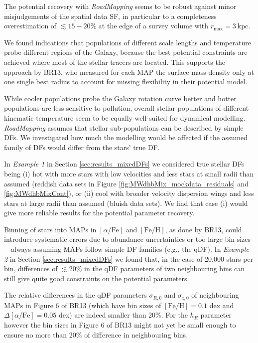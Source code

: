 \documentclass[iop,revtex4,numberedappendix,appendixfloats]{emulateapj}
\newcommand{\MAP}{MAP}
\newcommand{\MAPs}{MAPs}
\newcommand{\RM}{{\sl RoadMapping}}
\begin{document}
The potential recovery with \RM{} seems to be robust against minor misjudgements of the spatial data SF, in particular to a completeness overestimation of $\lesssim 15-20\%$ at the edge of a survey volume with $r_\text{max}=3~\text{kpc}$.

We found indications that populations of different scale lengths and temperature probe different regions of the Galaxy, because the best potential constraints are achieved where most of the stellar tracers are located. This supports the approach by BR13, who measured for each \MAP{} the surface mass density only at one single best radius to account for missing flexibility in their potential model. 

While cooler populations probe the Galaxy rotation curve better and hotter populations are less sensitive to pollution, overall stellar populations of different kinematic temperature seem to be equally well-suited for dynamical modelling.\\

 \RM{} assumes that stellar sub-populations can be described by simple DFs. We investigated how much the modelling would be affected if the assumed family of DFs would differ from the stars' true DF.

In \emph{Example 1} in Section \ref{sec:results_mixedDFs} we considered true stellar DFs being (i) hot with more stars with low velocities and less stars at small radii than assumed (reddish data sets in Figure \ref{fig:MWdhbMix_mockdata_residuals} and \ref{fig:MWdhbMixCont}), or (ii) cool with broader velocity dispersion wings and less stars at large radii than assumed (bluish data sets). We find that case (i) would give more reliable results for the potential parameter recovery.

Binning of stars into \MAPs{} in $[\alpha/\mathrm{Fe}]$ and $[\mathrm{Fe}/\mathrm{H}]$, as done by BR13, could introduce systematic errors due to abundance uncertainties or too large bin sizes---always assuming \MAPs{} follow simple DF families (e.g., the qDF). In \emph{Example 2} in Section \ref{sec:results_mixedDFs} we found that, in the case of 20,000 stars per bin, differences of $\lesssim 20\%$ in the qDF parameters of two neighbouring bins can still give quite good constraints on the potential parameters.

The relative differences in the qDF parameters $\sigma_{R,0}$ and $\sigma_{z,0}$ of neighbouring \MAPs{} in Figure 6 of BR13 (which have bin sizes of $[\mathrm{Fe}/\mathrm{H}] = 0.1$ dex and $\Delta [\alpha/\mathrm{Fe}] = 0.05$ dex) are indeed smaller than $20\%$. For the $h_R$ parameter however the bin sizes in Figure 6 of BR13 might not yet be small enough to ensure no more than $20\%$ of difference in neighbouring bins.
\end{document}
